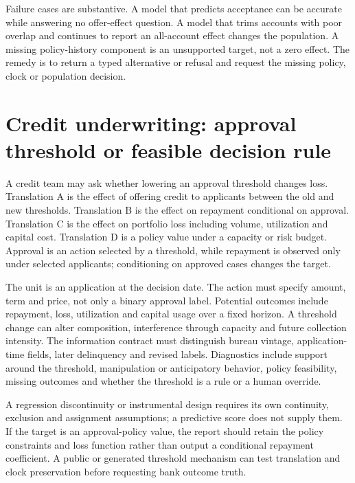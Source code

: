 Failure cases are substantive. A model that predicts acceptance can be accurate while answering no offer-effect question. A model that trims accounts with poor overlap and continues to report an all-account effect changes the population. A missing policy-history component is an unsupported target, not a zero effect. The remedy is to return a typed alternative or refusal and request the missing policy, clock or population decision.

\section{Credit underwriting: approval threshold or feasible decision rule}

A credit team may ask whether lowering an approval threshold changes loss. Translation A is the effect of offering credit to applicants between the old and new thresholds. Translation B is the effect on repayment conditional on approval. Translation C is the effect on portfolio loss including volume, utilization and capital cost. Translation D is a policy value under a capacity or risk budget. Approval is an action selected by a threshold, while repayment is observed only under selected applicants; conditioning on approved cases changes the target.

The unit is an application at the decision date. The action must specify amount, term and price, not only a binary approval label. Potential outcomes include repayment, loss, utilization and capital usage over a fixed horizon. A threshold change can alter composition, interference through capacity and future collection intensity. The information contract must distinguish bureau vintage, application-time fields, later delinquency and revised labels. Diagnostics include support around the threshold, manipulation or anticipatory behavior, policy feasibility, missing outcomes and whether the threshold is a rule or a human override.

A regression discontinuity or instrumental design requires its own continuity, exclusion and assignment assumptions; a predictive score does not supply them. If the target is an approval-policy value, the report should retain the policy constraints and loss function rather than output a conditional repayment coefficient. A public or generated threshold mechanism can test translation and clock preservation before requesting bank outcome truth.

